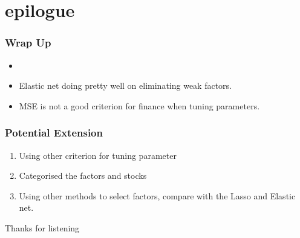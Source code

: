 \documentclass[12pt]{beamer}
\begin{document}


\section*{epilogue}
\begin{frame}
\frametitle{Wrap Up}
\begin{itemize}
\item 
\item Elastic net doing pretty well on eliminating weak factors.
\item MSE is not a good criterion for finance when tuning parameters.
\end{itemize}
\end{frame}

\begin{frame}
\frametitle{Potential Extension}
\begin{enumerate}
\item Using other criterion for tuning parameter
\item Categorised the factors and stocks
\item Using other methods to select factors, compare with the Lasso and Elastic net.
\end{enumerate}
\end{frame}


\begin{frame}
	\centering	
\huge{ Thanks for listening\\}
\end{frame}
\end{document}
